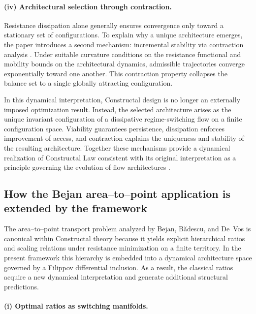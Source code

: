 \documentclass[12pt]{article}
\theoremstyle{plain}
\theoremstyle{definition}
\theoremstyle{remark}
\begin{document}
\paragraph{(iv) Architectural selection through contraction.}

Resistance dissipation alone generally ensures convergence only toward
a stationary set of configurations.
To explain why a unique architecture emerges, the paper introduces a
second mechanism: incremental stability via contraction analysis
\cite{LohmillerSlotine1998}.
Under suitable curvature conditions on the resistance functional and
mobility bounds on the architectural dynamics, admissible trajectories
converge exponentially toward one another.
This contraction property collapses the balance set to a single
globally attracting configuration.

In this dynamical interpretation, Constructal design is no longer an
externally imposed optimization result.
Instead, the selected architecture arises as the unique invariant
configuration of a dissipative regime-switching flow on a finite
configuration space.
Viability guarantees persistence, dissipation enforces improvement of
access, and contraction explains the uniqueness and stability of the
resulting architecture.
Together these mechanisms provide a dynamical realization of
Constructal Law consistent with its original interpretation as a
principle governing the evolution of flow architectures
\cite{Bejan2000Book,BejanLorente2011}.




\subsection{How the Bejan area--to--point application is extended by the framework}
\label{subsec:discussion_bejan_extension}

The area--to--point transport problem analyzed by
Bejan, B\u{a}descu, and De~Vos \cite{BejanBadescuDeVos2000AE}
is canonical within Constructal theory because it yields explicit
hierarchical ratios and scaling relations under resistance
minimization on a finite territory.
In the present framework this hierarchy is embedded into a dynamical
architecture space governed by a Filippov differential inclusion.
As a result, the classical ratios acquire a new dynamical
interpretation and generate additional structural predictions.

\paragraph{(i) Optimal ratios as switching manifolds.}
\end{document}
